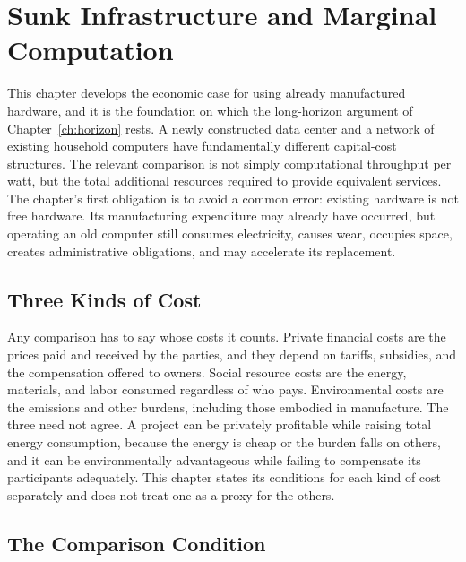 \chapter{Sunk Infrastructure and Marginal Computation}
\label{ch:sunk}

This chapter develops the economic case for using already manufactured hardware, and it is the foundation on which the long-horizon argument of Chapter~\ref{ch:horizon} rests. A newly constructed data center and a network of existing household computers have fundamentally different capital-cost structures. The relevant comparison is not simply computational throughput per watt, but the total additional resources required to provide equivalent services. The chapter's first obligation is to avoid a common error: existing hardware is not free hardware. Its manufacturing expenditure may already have occurred, but operating an old computer still consumes electricity, causes wear, occupies space, creates administrative obligations, and may accelerate its replacement.

\section{Three Kinds of Cost}

Any comparison has to say whose costs it counts. Private financial costs are the prices paid and received by the parties, and they depend on tariffs, subsidies, and the compensation offered to owners. Social resource costs are the energy, materials, and labor consumed regardless of who pays. Environmental costs are the emissions and other burdens, including those embodied in manufacture. The three need not agree. A project can be privately profitable while raising total energy consumption, because the energy is cheap or the burden falls on others, and it can be environmentally advantageous while failing to compensate its participants adequately. This chapter states its conditions for each kind of cost separately and does not treat one as a proxy for the others.

\section{The Comparison Condition}


